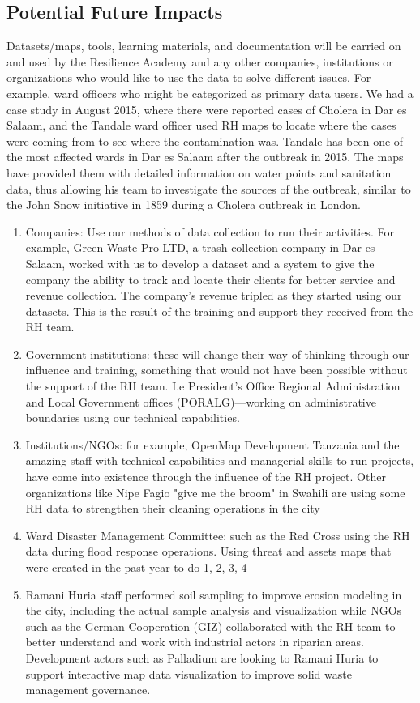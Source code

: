 \documentclass[a4paper,12pt,twoside]{article}
\begin{document}
\subsection{Potential Future Impacts}

Datasets/maps, tools, learning materials, and documentation will be carried on and used by the Resilience Academy and any other companies, institutions or organizations who would like to use the data to solve different issues. For example, ward officers who might be categorized as primary data users. We had a case study in August 2015,  where there were reported cases of Cholera in Dar es Salaam, and the Tandale ward officer used RH maps to locate where the cases were coming from to see where the contamination was. 
Tandale has been one of the most affected wards in Dar es Salaam after the outbreak in 2015. The maps have provided them with detailed information on water points and sanitation data, thus allowing his team to investigate the sources of the outbreak, similar to the John Snow initiative in 1859 during a Cholera outbreak in London.
\begin{enumerate}
    

\item Companies: Use our methods of data collection to run their activities. For example, Green Waste Pro LTD, a trash collection company in Dar es Salaam, worked with us to develop a dataset and a system to give the company the ability to track and locate their clients for better service and revenue collection. The company’s revenue tripled as they started using our datasets. This is the result of the training and support they received from the RH team.
\item Government institutions: these will change their way of thinking through our influence and training, something that would not have been possible without the support of the RH team. I.e President's Office Regional Administration and Local Government offices (PORALG)—working on administrative boundaries using our technical capabilities.
\item Institutions/NGOs: for example, OpenMap Development Tanzania and the amazing staff with technical capabilities and managerial skills to run projects, have come into existence through the influence of the RH project. Other organizations like Nipe Fagio "give me the broom" in Swahili are using some RH data to strengthen their cleaning operations in the city
\item Ward Disaster Management Committee: such as the Red Cross using the RH data during flood response operations. Using threat and assets maps that were created in the past year to do 1, 2, 3, 4
\item Ramani Huria staff performed soil sampling to improve erosion modeling in the city, including the actual sample analysis and visualization while NGOs such as the German Cooperation (GIZ) collaborated with the RH team to better understand and work with industrial actors in riparian areas. Development actors such as Palladium are looking to Ramani Huria to support interactive map data visualization to improve solid waste management governance.
\end{enumerate}
\newpage
\end{document}
